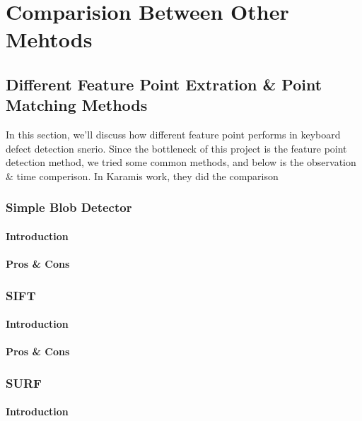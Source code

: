 \chapter{Comparision Between Other Mehtods}
\label{c:comparision}

\section{Different Feature Point Extration \& Point Matching Methods}
	In this section, we'll discuss how different feature point performs in keyboard defect detection snerio.
	Since the bottleneck of this project is the feature point detection method, we tried some common methods, and below is the observation \& time comperison.
	In Karamis work\cite{karami2017image}, they did the comparison
	\subsection{Simple Blob Detector}
		\subsubsection{Introduction}

		\subsubsection{Pros \& Cons}
	\subsection{SIFT}
		\subsubsection{Introduction}
		\subsubsection{Pros \& Cons}
	\subsection{SURF}
		\subsubsection{Introduction}
